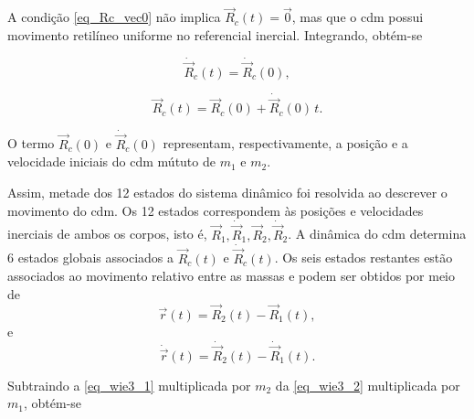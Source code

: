 
A condição \eqref{eq_Rc_vec0} não implica $\vec R_c(t)=\vec 0$, mas que o \gls{cdm} possui movimento retilíneo uniforme no referencial inercial. Integrando, obtém-se

\begin{equation}
\dot{\vec{R}}_{c}(t) = \dot{\vec{R}}_{c}(0),
\label{eq_Rc_dot_constante}
\end{equation}

\begin{equation}
\vec{R}_{c}(t) = \vec{R}_{c}(0) + \dot{\vec{R}}_{c}(0)\,t.
\label{eq_Rc_movimento_uniforme}
\end{equation}

O termo $\vec{R}_{c}(0)$ e $\dot{\vec{R}}_{c}(0)$ representam, respectivamente, a posição e a velocidade iniciais do \gls{cdm} mútuto de $m_1$ e $m_2$.



Assim, metade dos 12 estados do sistema dinâmico foi resolvida ao descrever o movimento do \gls{cdm}.
Os 12 estados correspondem às posições e velocidades inerciais de ambos os corpos, isto é, $\vec R_1,\dot{\vec R}_1,\vec R_2,\dot{\vec R}_2$.
A dinâmica do \gls{cdm} determina 6 estados globais associados a $\vec R_c(t)$ e $\dot{\vec R}_c(t)$.
Os seis estados restantes estão associados ao movimento relativo entre as massas e podem ser obtidos por meio de
\begin{equation}
\vec r(t)=\vec R_2(t)-\vec R_1(t),
\label{eq_posicao_relativa}
\end{equation}
e
\begin{equation}
\dot{\vec r}(t)=\dot{\vec R}_2(t)-\dot{\vec R}_1(t).
\label{eq_velocidade_relativa}
\end{equation}

Subtraindo a \eqref{eq_wie3_1} multiplicada por $m_2$ da \eqref{eq_wie3_2} multiplicada por $m_1$, obtém-se


